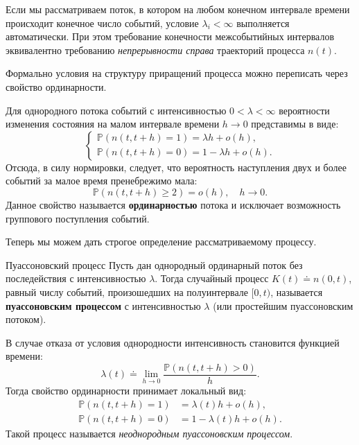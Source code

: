 Если мы рассматриваем поток, в котором на любом конечном интервале времени происходит конечное число событий, условие $\lambda_i < \infty$ выполняется автоматически. При этом требование конечности межсобытийных интервалов эквивалентно требованию \textit{непрерывности справа} траекторий процесса $n(t)$.

Формально условия на структуру приращений процесса можно переписать через свойство ординарности.

\begin{statement}
Для однородного потока событий с интенсивностью $0 < \lambda < \infty$ вероятности изменения состояния на малом интервале времени $h \to 0$ представимы в виде:
\begin{equation}
    \begin{cases}
        \mathbb{P}(n(t, t+h) = 1) = \lambda h + o(h), \\
        \mathbb{P}(n(t, t+h) = 0) = 1 - \lambda h + o(h).
    \end{cases}
\end{equation}
Отсюда, в силу нормировки, следует, что вероятность наступления двух и более событий за малое время пренебрежимо мала:
$$ \mathbb{P}(n(t, t+h) \ge 2) = o(h), \quad h \to 0. $$
Данное свойство называется \textbf{ординарностью} потока и исключает возможность группового поступления событий.
\end{statement}

Теперь мы можем дать строгое определение рассматриваемому процессу.

\begin{definition}{Пуассоновский процесс}
Пусть дан однородный ординарный поток без последействия с интенсивностью $\lambda$. Тогда случайный процесс $K(t) \doteq n(0, t)$, равный числу событий, произошедших на полуинтервале $[0, t)$, называется \textbf{пуассоновским процессом} с интенсивностью $\lambda$ (или простейшим пуассоновским потоком).
\end{definition}

\begin{note}
В случае отказа от условия однородности интенсивность становится функцией времени:
$$ \lambda(t) \doteq \lim_{h \to 0} \frac{\mathbb{P}(n(t, t+h) > 0)}{h}. $$
Тогда свойство ординарности принимает локальный вид:
\begin{align*}
    \mathbb{P}(n(t, t+h) = 1) &= \lambda(t)h + o(h), \\
    \mathbb{P}(n(t, t+h) = 0) &= 1 - \lambda(t)h + o(h).
\end{align*}
Такой процесс называется \textit{неоднородным пуассоновским процессом}.
\end{note}

